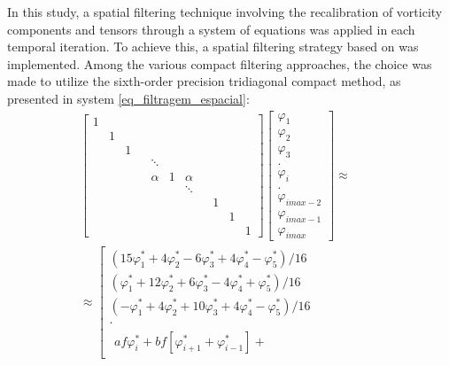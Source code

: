 \documentclass[preprint, 12pt]{elsarticle}
\begin{document}
In this study, a spatial filtering technique involving the recalibration of vorticity components and tensors through a system of equations was applied in each temporal iteration. To achieve this, a spatial filtering strategy based on \citet{lele1992compact} was implemented. Among the various compact filtering approaches, the choice was made to utilize the sixth-order precision tridiagonal compact method, as presented in system \eqref{eq_filtragem_espacial}:
\begin{align}
\left[\begin{array}{ccccccccccc}
    1 &  & & & & & & & & &\\
     & 1 &  & & & & & & & & \\
    & & 1 & & & & & & & &\\
    & &  &  & \ddots & &  &  & & & \\
    & & &  & \alpha & 1 & \alpha &  & & &  \\
    & & & &  &  & \ddots &  &  & & \\
    & & & & &  &  & & 1 & & \\
    & & & & &  &  & & & 1 & \\
    & & & & &  &  & & &  & 1
\end{array}\right] \left[\begin{array}{c}
    \varphi_{1} \\
    \varphi_{2}  \\
    \varphi_{3}  \\
     . \\
    \varphi_{i}  \\
     . \\
    \varphi_{imax-2} \\
    \varphi_{imax-1} \\
    \varphi_{imax} 
\end{array}\right] \approx \hspace{1cm} \nonumber\\ 
\approx \left[\begin{array}{c}
(15\varphi_{1}^* +  4 \varphi_{2}^* -  6 \varphi_{3}^* +  4  \varphi_{4}^*
 -         \varphi_{5}^* ) / 16 \\
( \varphi_{1}^* + 12\varphi_{2}^*+  6\varphi_{3}^* -  4 \varphi_{4}^*
+         \varphi_{5}^*) / 16\\
 (   - \varphi_{1}^* +  4\varphi_{2}^*
+ 10\varphi_{3}^* +  4\varphi_{4}^* - \varphi_{5}^* ) / 16\\
. \\
\begin{gathered}
    af \varphi_{i}^*+bf\left[\varphi_{i+1}^*+\varphi_{i-1}^*\right]+ 

\end{gathered}
\end{array}
\end{align}
\end{document}
